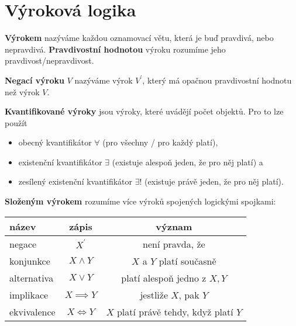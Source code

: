 \section{Výroková logika}
\begin{definition}
  \textbf{Výrokem} nazýváme každou oznamovací větu, která je buď pravdivá, nebo nepravdivá. \textbf{Pravdivostní hodnotou} výroku rozumíme jeho pravdivost/nepravdivost.
\end{definition}

\begin{definition}
  \textbf{Negací výroku} $V$ nazýváme výrok $V^\prime$, který má opačnou pravdivostní hodnotu než výrok $V$.
\end{definition}

\begin{pozn}
  \textbf{Kvantifikované výroky} jsou výroky, které uvádějí počet objektů. Pro to lze použít
  \begin{itemize}
    \item obecný kvantifikátor $\forall$ (pro všechny / pro každý platí),
    \item existenční kvantifikátor $\exists$ (existuje alespoň jeden, že pro něj platí) a
    \item zesílený existenční kvantifikátor $\exists !$ (existuje právě jeden, že pro něj platí).
  \end{itemize}
\end{pozn}

\begin{definition}
  \textbf{Složeným výrokem} rozumíme více výroků spojených logickými spojkami:
  \begin{center}
    \begin{tabular}{l | c c}
      název & zápis & význam \\
      \hline
      negace & $X^\prime$ & není pravda, že \\
      konjunkce & $X\land Y$ & $X$ a $Y$ platí současně \\
      alternativa & $X\lor Y$ & platí alespoň jedno z $X,Y$\\
      implikace & $X\implies Y$ & jestliže $X$, pak $Y$\\
      ekvivalence & $X\iff Y$ & $X$ platí právě tehdy, když platí $Y$
    \end{tabular}
  \end{center}
\end{definition}


